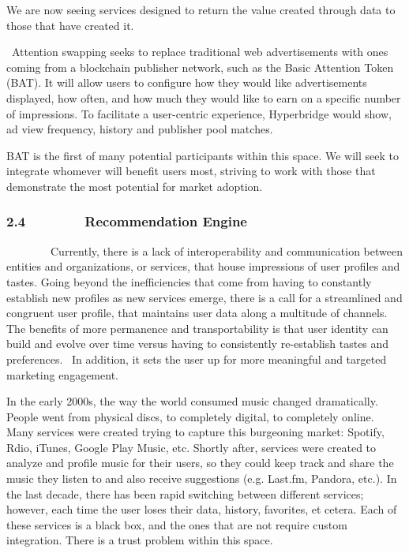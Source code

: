 \documentclass[]{article}
\begin{document}
{We are now seeing services designed to return the value created through
data to those that have created it. }

{~Attention swapping seeks to replace traditional web advertisements
with ones coming from a blockchain publisher network, such as the Basic
Attention Token (BAT). It will allow users to configure how they would
like advertisements displayed, how often, and how much they would like
to earn on a specific number of impressions. To facilitate a
user-centric experience, Hyperbridge would show, ad view frequency,
history and publisher pool matches.}

{}

{}

{BAT is the first of many potential participants within this space. We
will seek to integrate whomever will benefit users most, striving to
work with those that demonstrate the most potential for market
adoption.}

{}

\hypertarget{h.ap0uyehaseve}{%
\subsubsection{\texorpdfstring{{2.4~~~~~~~~Recommendation
Engine}}{2.4~~~~~~~~Recommendation Engine}}\label{h.ap0uyehaseve}}

{~~~~~~~~Currently, there is a lack of interoperability and
communication between entities and organizations, or services, that
house impressions of user profiles and tastes. Going beyond the
inefficiencies that come from having to constantly establish new
profiles as new services emerge, there is a call for a streamlined and
congruent user profile, that maintains user data along a multitude of
channels. The benefits of more permanence and transportability is that
user identity can build and evolve over time versus having to
consistently re-establish tastes and preferences. ~In addition, it sets
the user up for more meaningful and targeted marketing engagement. }

{}

{In the early 2000s, the way the world consumed music changed
dramatically. People went from physical discs, to completely digital, to
completely online. Many services were created trying to capture this
burgeoning market: Spotify, Rdio, iTunes, Google Play Music, etc.
Shortly after, services were created to analyze and profile music for
their users, so they could keep track and share the music they listen to
and also receive suggestions (e.g. Last.fm, Pandora, etc.). In the last
decade, there has been rapid switching between different services;
however, each time the user loses their data, history, favorites, et
cetera. Each of these services is a black box, and the ones that are not
require custom integration. There is a trust problem within this space.
}
\end{document}
